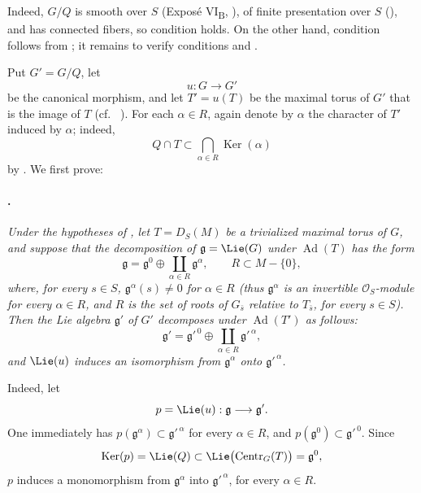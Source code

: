 Indeed, \(G/Q\) is smooth over \(S\)
\textup{(Exposé VI\textsubscript{B}, )}, of finite presentation
over \(S\) \textup{()}, and has connected fibers, so
condition \textup{} holds. On the other hand, condition
\textup{} follows from ; it remains to verify
conditions \textup{} and \textup{}.

Put \(G'=G/Q\), let
\[
  u:G\longrightarrow G'
\]
be the canonical morphism, and let \(T'=u(T)\) be the maximal torus
of \(G'\) that is the image of \(T\)
\textup{(cf.\  \textup{})}. For each
\(\alpha\in R\), again denote by \(\alpha\) the character of
\(T'\) induced by \(\alpha\); indeed,
\[
  Q\cap T
  \subset
  \bigcap_{\alpha\in R}\operatorname{Ker}(\alpha)
\]
by  \textup{}. We first prove:

\paragraph{.}
\textit{Under the hypotheses of , let \(T=D_S(M)\) be a
trivialized maximal torus of \(G\), and suppose that the
decomposition of \(\mathfrak g=\Lie(G)\) under
\(\operatorname{Ad}(T)\) has the form}
\[
  \mathfrak g
  =
  \mathfrak g^0
  \oplus
  \coprod_{\alpha\in R}\mathfrak g^\alpha,
  \qquad
  R\subset M-\{0\},
\]
\textit{where, for every \(s\in S\),
\(\mathfrak g^\alpha(s)\ne0\) for \(\alpha\in R\)
\textup{(thus \(\mathfrak g^\alpha\) is an invertible
\(\mathcal O_S\)-module for every \(\alpha\in R\), and \(R\) is
the set of roots of \(G_{\bar s}\) relative to \(T_{\bar s}\), for
every \(s\in S\))}. Then the Lie algebra \(\mathfrak g'\) of \(G'\)
decomposes under \(\operatorname{Ad}(T')\) as follows:}
\[
  \mathfrak g'
  =
  \mathfrak g'^{\,0}
  \oplus
  \coprod_{\alpha\in R}\mathfrak g'^{\,\alpha},
\]
\textit{and \(\Lie(u)\) induces an isomorphism from
\(\mathfrak g^\alpha\) onto \(\mathfrak g'^{\,\alpha}\).}

Indeed, let
\[
  p=\Lie(u):\mathfrak g\longrightarrow\mathfrak g'.
\]
One immediately has
\(p(\mathfrak g^\alpha)\subset\mathfrak g'^{\,\alpha}\) for every
\(\alpha\in R\), and
\(p(\mathfrak g^0)\subset\mathfrak g'^{\,0}\). Since
\[
  \operatorname{Ker}(p)
  =
  \Lie(Q)
  \subset
  \Lie\bigl(\operatorname{Centr}_G(T)\bigr)
  =
  \mathfrak g^0,
\]
\(p\) induces a monomorphism from \(\mathfrak g^\alpha\) into
\(\mathfrak g'^{\,\alpha}\), for every \(\alpha\in R\).

